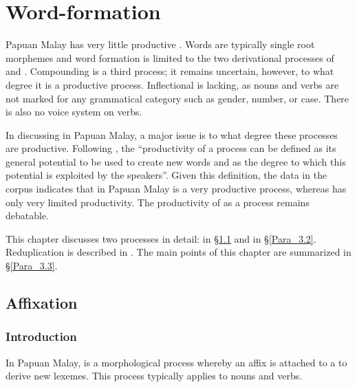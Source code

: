 \chapter[Word{}-formation]{Word-formation}\label{Para_3}

Papuan Malay has very little productive . Words are typically single root morphemes and word formation is limited to the two derivational processes of  and . Compounding is a third  process; it remains uncertain, however, to what degree it is a productive process. Inflectional  is lacking, as nouns and verbs are not marked for any grammatical category such as gender, number, or case. There is also no voice system on verbs.



In discussing  in Papuan Malay, a major issue is to what degree these processes are productive. Following \citet[127]{Plag.2006}, the “productivity of a  process can be defined as its general potential to be used to create new words and as the degree to which this potential is exploited by the speakers”. Given this definition, the data in the corpus indicates that  in Papuan Malay is a very productive process, whereas  has only very limited productivity. The productivity of  as a  process remains debatable.



This chapter discusses two  processes in detail:  in §\ref{Para_3.1} and  in §\ref{Para_3.2}. Reduplication is described in . The main points of this chapter are summarized in §\ref{Para_3.3}.


\section{Affixation}\label{Para_3.1}
\subsection{Introduction}\label{Para_3.1.1}
In Papuan Malay,  is a morphological process whereby an affix is attached to a  to derive new lexemes. This process typically applies to nouns and verbs.



